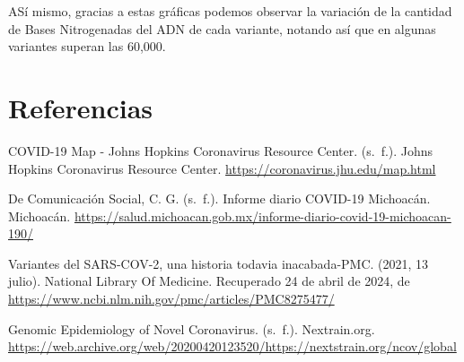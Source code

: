 \documentclass[
]{article}
\begin{document}
ASí mismo, gracias a estas gráficas podemos observar la variación de la
cantidad de Bases Nitrogenadas del ADN de cada variante, notando así que
en algunas variantes superan las 60,000.

\hypertarget{referencias}{%
\section{Referencias}\label{referencias}}

COVID-19 Map - Johns Hopkins Coronavirus Resource Center. (s.~f.). Johns
Hopkins Coronavirus Resource Center.
\url{https://coronavirus.jhu.edu/map.html}

De Comunicación Social, C. G. (s.~f.). Informe diario COVID-19
Michoacán. Michoacán.
\url{https://salud.michoacan.gob.mx/informe-diario-covid-19-michoacan-190/}

Variantes del SARS-COV-2, una historia todavia inacabada-PMC. (2021, 13
julio). National Library Of Medicine. Recuperado 24 de abril de 2024, de
\url{https://www.ncbi.nlm.nih.gov/pmc/articles/PMC8275477/}

Genomic Epidemiology of Novel Coronavirus. (s.~f.). Nextrain.org.
\url{https://web.archive.org/web/20200420123520/https://nextstrain.org/ncov/global}
\end{document}

